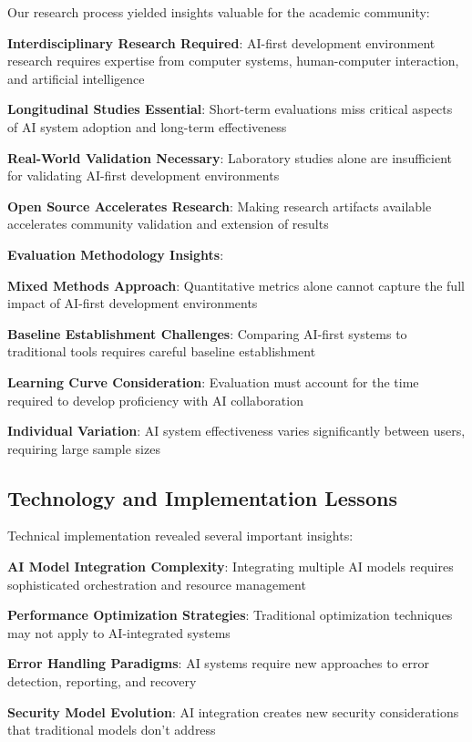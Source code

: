 Our research process yielded insights valuable for the academic community:

\begin{expandedlist}
    \item \textbf{Interdisciplinary Research Required}: AI-first development environment research requires expertise from computer systems, human-computer interaction, and artificial intelligence
    \item \textbf{Longitudinal Studies Essential}: Short-term evaluations miss critical aspects of AI system adoption and long-term effectiveness
    \item \textbf{Real-World Validation Necessary}: Laboratory studies alone are insufficient for validating AI-first development environments
    \item \textbf{Open Source Accelerates Research}: Making research artifacts available accelerates community validation and extension of results
\end{expandedlist}

\textbf{Evaluation Methodology Insights}:
\begin{compactlist}
    \item \textbf{Mixed Methods Approach}: Quantitative metrics alone cannot capture the full impact of AI-first development environments
    \item \textbf{Baseline Establishment Challenges}: Comparing AI-first systems to traditional tools requires careful baseline establishment
    \item \textbf{Learning Curve Consideration}: Evaluation must account for the time required to develop proficiency with AI collaboration
    \item \textbf{Individual Variation}: AI system effectiveness varies significantly between users, requiring large sample sizes
\end{compactlist}

\subsection*{Technology and Implementation Lessons}

Technical implementation revealed several important insights:

\begin{expandedlist}
    \item \textbf{AI Model Integration Complexity}: Integrating multiple AI models requires sophisticated orchestration and resource management
    \item \textbf{Performance Optimization Strategies}: Traditional optimization techniques may not apply to AI-integrated systems
    \item \textbf{Error Handling Paradigms}: AI systems require new approaches to error detection, reporting, and recovery
    \item \textbf{Security Model Evolution}: AI integration creates new security considerations that traditional models don't address
\end{expandedlist}


